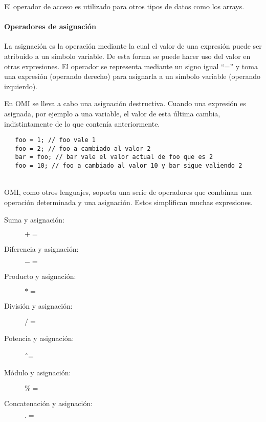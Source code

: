 El operador de acceso es utilizado para otros tipos de datos como los arrays.


\paragraph{Operadores de asignación} \label{sec:op_asig}
La asignación es la operación mediante la cual el valor de una expresión puede ser atribuido a un símbolo variable. De esta forma se puede hacer uso 
del valor en otras expresiones. El operador se representa mediante un signo igual ``='' y toma una expresión (operando derecho) para asignarla a un símbolo variable (operando izquierdo).
 

En OMI se lleva a cabo una asignación destructiva. Cuando una expresión es asignada, por ejemplo a una variable, el valor de esta última cambia, indistintamente de lo que contenía
anteriormente.\\

 \begin{lstlisting}
   foo = 1; // foo vale 1
   foo = 2; // foo a cambiado al valor 2
   bar = foo; // bar vale el valor actual de foo que es 2
   foo = 10; // foo a cambiado al valor 10 y bar sigue valiendo 2
\end{lstlisting} 
\hfill\\

OMI, como otros lenguajes, soporta una serie de operadores que combinan una operación determinada y una asignación. Estos simplifican
muchas expresiones.

\begin{description}
\item [Suma y asignación:] $+=$
\item [Diferencia y asignación:] $-=$
\item [Producto y asignación:] $*=$
\item [División y asignación:] $/=$
\item [Potencia y asignación:] \^ \ =\hfill 
\item [Módulo y asignación:] $\%=$
\item [Concatenación y asignación:] $.=$
\end{description} 

